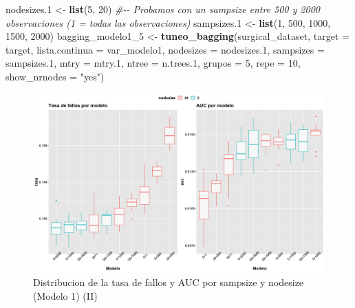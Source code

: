\documentclass[
]{article}
\newenvironment{Shaded}{\begin{snugshade}}{\end{snugshade}}
\newcommand{\CommentTok}[1]{\textcolor[rgb]{0.56,0.35,0.01}{\textit{#1}}}
\newcommand{\DataTypeTok}[1]{\textcolor[rgb]{0.13,0.29,0.53}{#1}}
\newcommand{\DecValTok}[1]{\textcolor[rgb]{0.00,0.00,0.81}{#1}}
\newcommand{\FloatTok}[1]{\textcolor[rgb]{0.00,0.00,0.81}{#1}}
\newcommand{\KeywordTok}[1]{\textcolor[rgb]{0.13,0.29,0.53}{\textbf{#1}}}
\newcommand{\NormalTok}[1]{#1}
\newcommand{\StringTok}[1]{\textcolor[rgb]{0.31,0.60,0.02}{#1}}
\begin{document}
\begin{Shaded}
\begin{Highlighting}[]
\NormalTok{nodesizes}\FloatTok{.1}\NormalTok{ <{-}}\StringTok{ }\KeywordTok{list}\NormalTok{(}\DecValTok{5}\NormalTok{, }\DecValTok{20}\NormalTok{)}
\CommentTok{\#{-}{-} Probamos con un sampsize entre 500 y 2000 observaciones (1 = todas las observaciones)}
\NormalTok{sampsizes}\FloatTok{.1}\NormalTok{ <{-}}\StringTok{ }\KeywordTok{list}\NormalTok{(}\DecValTok{1}\NormalTok{, }\DecValTok{500}\NormalTok{, }\DecValTok{1000}\NormalTok{, }\DecValTok{1500}\NormalTok{, }\DecValTok{2000}\NormalTok{)}
\NormalTok{bagging\_modelo1\_}\DecValTok{5}\NormalTok{ <{-}}\StringTok{ }\KeywordTok{tuneo\_bagging}\NormalTok{(surgical\_dataset, }\DataTypeTok{target =}\NormalTok{ target,}
                                   \DataTypeTok{lista.continua =}\NormalTok{ var\_modelo1,}
                                   \DataTypeTok{nodesizes =}\NormalTok{ nodesizes}\FloatTok{.1}\NormalTok{,}
                                   \DataTypeTok{sampsizes =}\NormalTok{ sampsizes}\FloatTok{.1}\NormalTok{, }\DataTypeTok{mtry =}\NormalTok{ mtry}\FloatTok{.1}\NormalTok{,}
                                   \DataTypeTok{ntree =}\NormalTok{ n.trees}\FloatTok{.1}\NormalTok{, }\DataTypeTok{grupos =} \DecValTok{5}\NormalTok{, }\DataTypeTok{repe =} \DecValTok{10}\NormalTok{,}
                                   \DataTypeTok{show\_nrnodes =} \StringTok{"yes"}\NormalTok{)}
\end{Highlighting}
\end{Shaded}

\begin{figure}[h!]

{\centering \includegraphics[width=0.99\linewidth,height=0.99\textheight,]{./charts/03_distribucion_auc_tasa_fallos_modelo1_comp} 

}

\caption{Distribucion de la tasa de fallos y AUC por sampsize y nodesize (Modelo 1) (II)}\label{fig:unnamed-chunk-70}
\end{figure}
\end{document}
